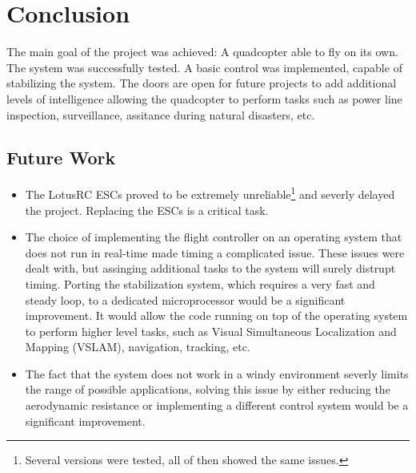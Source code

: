 \documentclass[conference]{IEEEtran}
\begin{document}



\section{Conclusion}

The main goal of the project was achieved: A quadcopter able to fly on its own. The system was successfully tested. A basic control was implemented, capable of stabilizing the system. The doors are open for future projects to add additional levels of intelligence allowing the quadcopter to perform tasks such as power line inspection, surveillance, assitance during natural disasters, etc.

\subsection{Future Work}
\begin{itemize}
\item The LotusRC ESCs proved to be extremely unreliable\footnote{Several versions were tested, all of then showed the same issues.} and severly delayed the project. Replacing the ESCs is a critical task.
\item The choice of implementing the flight controller on an operating system that does not run in real-time made timing a complicated issue. These issues were dealt with, but assinging additional tasks to the system will surely distrupt timing. Porting the stabilization system, which requires a very fast and steady loop, to a dedicated microprocessor would be a significant improvement. It would allow the code running on top of the operating system to perform higher level tasks, such as Visual Simultaneous Localization and Mapping (VSLAM), navigation, tracking, etc.
\item The fact that the system does not work in a windy environment severly limits the range of possible applications, solving this issue by either reducing the aerodynamic resistance or implementing a different control system would be a significant improvement.
\end{itemize}
\end{document}
